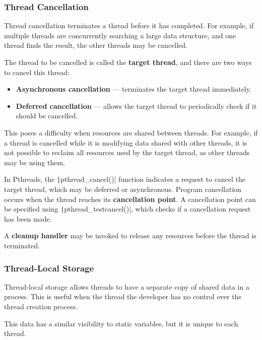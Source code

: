 \documentclass{article}
\begin{document}
\subsubsection{Thread Cancellation}
Thread cancellation terminates a thread before it has completed. For
example, if multiple threads are concurrently searching a large data
structure, and one thread finds the result, the other threads may be
cancelled.

The thread to be cancelled is called the \textbf{target thread}, and
there are two ways to cancel this thread:
\begin{itemize}
    \item \textbf{Asynchronous cancellation} --- terminates the target
          thread immediately.
    \item \textbf{Deferred cancellation} --- allows the target thread
          to periodically check if it should be cancelled.
\end{itemize}
This poses a difficulty when resources are shared between threads.
For example, if a thread is cancelled while it is modifying data shared
with other threads, it is not possible to reclaim all resources used by
the target thread, as other threads may be using them.

In Pthreads, the \texttt|pthread_cancel()| function indicates a
request to cancel the target thread, which may be deferred or
asynchronous. Program cancellation occurs when the thread reaches its
\textbf{cancellation point}. A cancellation point can be specified
using \texttt|pthread_testcancel()|, which checks if a
cancellation request has been made.

A \textbf{cleanup handler} may be invoked to release any resources
before the thread is terminated.
\subsubsection{Thread-Local Storage}
Thread-local storage allows threads to have a separate copy of shared
data in a process. This is useful when the thread the developer has no
control over the thread creation process.

This data has a similar visibility to static variables, but it is
unique to each thread.
\end{document}
